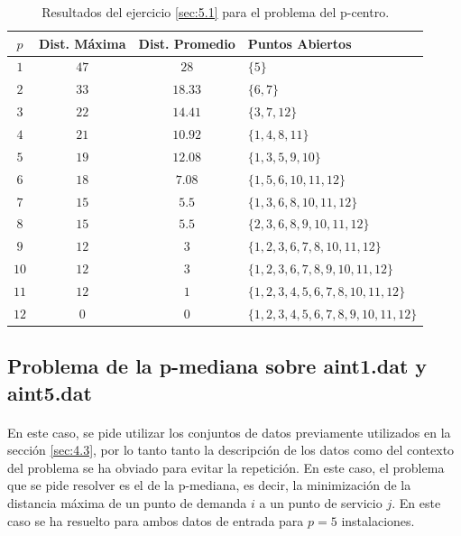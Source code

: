 \documentclass[spanish]{article}
\begin{document}
			\begin{table}[h]
				\begin{center}
					\begin{tabular}{|c || c || c || l | }
						\hline
						$p$		& Dist. Máxima 	& Dist. Promedio	& Puntos Abiertos	 \\ \hline \hline
						$1$ 	& $47$ 					& $28$						& $\{5\}$ \\ \hline
						$2$ 	& $33$ 					& $18.33$					& $\{6,7\}$ \\ \hline
						$3$ 	& $22$ 					& $14.41$					& $\{3,7,12\}$ \\ \hline
						$4$ 	& $21$ 					& $10.92$					& $\{1,4,8,11\}$ \\ \hline
						$5$ 	& $19$ 					& $12.08$					& $\{1,3,5,9,10\}$ \\ \hline
						$6$ 	& $18$ 					& $7.08$					& $\{1,5,6,10,11,12 \}$ \\ \hline
						$7$ 	& $15$ 					& $5.5$						& $\{1,3,6,8,10,11,12\}$ \\ \hline
						$8$ 	& $15$ 					& $5.5$						& $\{2,3,6,8,9,10,11,12\}$ \\ \hline
						$9$ 	& $12$ 					& $3$							& $\{1,2,3,6,7,8,10,11,12\}$ \\ \hline
						$10$ 	& $12$ 					& $3$							& $\{1,2,3,6,7,8,9,10,11,12\}$ \\ \hline
						$11$ 	& $12$ 					& $1$							& $\{1,2,3,4,5,6,7,8,10,11,12\}$ \\ \hline
						$12$ 	& $0$ 					& $0$							& $\{1,2,3,4,5,6,7,8,9,10,11,12\}$ \\
						\hline
					\end{tabular}
				\end{center}
				\caption{Resultados del ejercicio \ref{sec:5.1} para el problema del p-centro.}
				\label{table:sol-5.1center}
			\end{table}

		\subsection{Problema de la p-mediana sobre aint1.dat y aint5.dat}
		\label{sec:5.2}

			\paragraph{}
			En este caso, se pide utilizar los conjuntos de datos previamente utilizados en la sección \ref{sec:4.3}, por lo tanto tanto la descripción de los datos como del contexto del problema se ha obviado para evitar la repetición. En este caso, el problema que se pide resolver es el de la p-mediana, es decir, la minimización de la distancia máxima de un punto de demanda $i$ a un punto de servicio $j$. En este caso se ha resuelto para ambos datos de entrada para $p = 5$ instalaciones.
\end{document}
